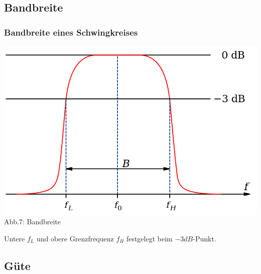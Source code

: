 


\subsection*{Bandbreite}
\begin{frame}
\frametitle{Bandbreite eines Schwingkreises}
\begin{center}
	\includegraphics[scale=0.3]{a04/bandwidth.png}\\
	\tiny{Abb.7: Bandbreite \cite{wmen}}
\end{center}
Untere $f_L$ und obere Grenzfrequenz $f_H$ festgelegt beim $-3dB$-Punkt.
\end{frame}

\subsection*{Güte}


